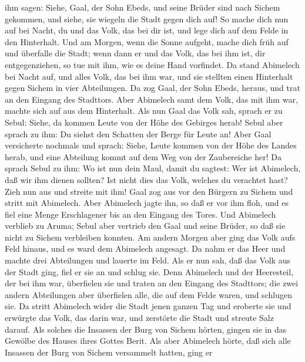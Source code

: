 ihm sagen: Siehe, Gaal, der Sohn Ebeds, und seine Brüder sind nach
Sichem gekommen, und siehe, sie wiegeln die Stadt gegen dich auf!
 So mache dich nun auf bei Nacht, du und das Volk, das
bei dir ist, und lege dich auf dem Felde in den Hinterhalt.
 Und am Morgen, wenn die Sonne aufgeht, mache dich früh
auf und überfalle die Stadt; wenn dann er und das Volk, das bei ihm ist,
dir entgegenziehen, so tue mit ihm, wie es deine Hand vorfindet.
 Da stand Abimelech bei Nacht auf, und alles Volk, das
bei ihm war, und sie stellten einen Hinterhalt gegen Sichem in vier
Abteilungen.  Da zog Gaal, der Sohn Ebeds, heraus, und
trat an den Eingang des Stadttors. Aber Abimelech samt dem Volk, das mit
ihm war, machte sich auf aus dem Hinterhalt.  Als nun
Gaal das Volk sah, sprach er zu Sebul: Siehe, da kommen Leute von der
Höhe des Gebirges herab! Sebul aber sprach zu ihm: Du siehst den
Schatten der Berge für Leute an!  Aber Gaal versicherte
nochmals und sprach: Siehe, Leute kommen von der Höhe des Landes herab,
und eine Abteilung kommt auf dem Weg von der Zaubereiche her!
 Da sprach Sebul zu ihm: Wo ist nun dein Maul, damit du
sagtest: Wer ist Abimelech, daß wir ihm dienen sollten? Ist nicht dies
das Volk, welches du verachtet hast? Zieh nun aus und streite mit ihm!
 Gaal zog aus vor den Bürgern zu Sichem und stritt mit
Abimelech.  Aber Abimelech jagte ihn, so daß er vor ihm
floh, und es fiel eine Menge Erschlagener bis an den Eingang des Tores.
 Und Abimelech verblieb zu Aruma; Sebul aber vertrieb den
Gaal und seine Brüder, so daß sie nicht zu Sichem verbleiben konnten.
 Am andern Morgen aber ging das Volk aufs Feld hinaus,
und es ward dem Abimelech angesagt.  Da nahm er das Heer
und machte drei Abteilungen und lauerte im Feld. Als er nun sah, daß das
Volk aus der Stadt ging, fiel er sie an und schlug sie. 
Denn Abimelech und der Heeresteil, der bei ihm war, überfielen sie und
traten an den Eingang des Stadttors; die zwei andern Abteilungen aber
überfielen alle, die auf dem Felde waren, und schlugen sie.
 Da stritt Abimelech wider die Stadt jenen ganzen Tag und
eroberte sie und erwürgte das Volk, das darin war, und zerstörte die
Stadt und streute Salz darauf.  Als solches die Insassen
der Burg von Sichem hörten, gingen sie in das Gewölbe des Hauses ihres
Gottes Berit.  Als aber Abimelech hörte, daß sich alle
Insassen der Burg von Sichem versammelt hatten,  ging er
